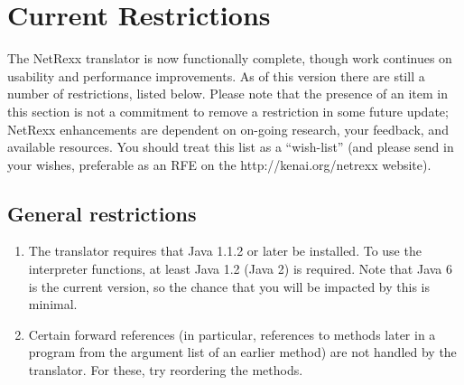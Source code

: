 \chapter{Current Restrictions}
The NetRexx translator is now functionally complete, though work continues on usability and performance improvements. As of this version there are still a number of restrictions, listed below. 
Please note that the presence of an item in this section is not a commitment to remove a restriction in some future update; NetRexx enhancements are dependent on on-going research, your feedback, and available resources. You should treat this list as a “wish-list” (and please send in your wishes, preferable as an RFE on the http://kenai.org/netrexx website). 
\section{General restrictions}
\begin{enumerate}
\item The translator requires that Java 1.1.2 or later be installed. To use the interpreter functions, at least Java 1.2 (Java 2) is required. Note that Java 6 is the current version, so the chance that you will be impacted by this is minimal. 
\item Certain forward references (in particular, references to methods later in a program from the argument list of an earlier method) are not handled by the translator. For these, try reordering the methods.
\end{enumerate}
